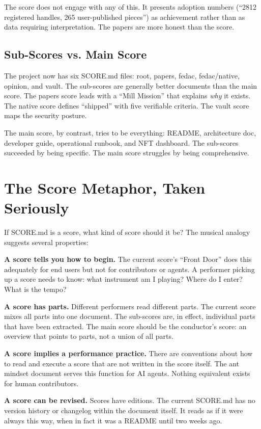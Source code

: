 \documentclass[10pt,letterpaper,twocolumn]{article}
\begin{document}
The score does not engage with any of this. It presents adoption numbers (``2812 registered handles, 265 user-published pieces'') as achievement rather than as data requiring interpretation. The papers are more honest than the score.

\subsection{Sub-Scores vs. Main Score}

The project now has six SCORE.md files: root, papers, fedac, fedac/native, opinion, and vault. The sub-scores are generally better documents than the main score. The papers score leads with a ``Mill Mission'' that explains \emph{why} it exists. The native score defines ``shipped'' with five verifiable criteria. The vault score maps the security posture.

The main score, by contrast, tries to be everything: README, architecture doc, developer guide, operational runbook, and NFT dashboard. The sub-scores succeeded by being specific. The main score struggles by being comprehensive.

\section{The Score Metaphor, Taken Seriously}

If SCORE.md is a score, what kind of score should it be? The musical analogy suggests several properties:

\textbf{A score tells you how to begin.} The current score's ``Front Door'' does this adequately for end users but not for contributors or agents. A performer picking up a score needs to know: what instrument am I playing? Where do I enter? What is the tempo?

\textbf{A score has parts.} Different performers read different parts. The current score mixes all parts into one document. The sub-scores are, in effect, individual parts that have been extracted. The main score should be the conductor's score: an overview that points to parts, not a union of all parts.

\textbf{A score implies a performance practice.} There are conventions about how to read and execute a score that are not written in the score itself. The ant mindset document serves this function for AI agents. Nothing equivalent exists for human contributors.

\textbf{A score can be revised.} Scores have editions. The current SCORE.md has no version history or changelog within the document itself. It reads as if it were always this way, when in fact it was a README until two weeks ago.
\end{document}
